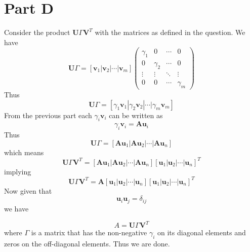 \documentclass[10pt]{report}
\begin{document}
\section*{Part D}
Consider the product $\textbf{U} \Gamma \textbf{V}^T$ with the matrices as defined in the question. We have
$$\textbf{U} \Gamma = [ \textbf{v}_1 | \textbf{v}_2 | \cdots | \textbf{v}_m ] \begin{pmatrix}
\gamma_{1} & 0 & \cdots & 0 \\
0 & \gamma_{2} & \cdots & 0 \\
\vdots  & \vdots  & \ddots & \vdots  \\
0 & 0 & \cdots & \gamma_{m}
\end{pmatrix}$$
Thus
$$\textbf{U} \Gamma = [ \gamma_1 \textbf{v}_1 | \gamma_2 \textbf{v}_2 | \cdots | \gamma_m \textbf{v}_m ] $$
From the previous part each $\gamma_{i} \textbf{v}_i$ can be written as
$$\gamma_{i} \textbf{v}_i = \textbf{Au}_i$$
Thus $$\textbf{U} \Gamma = [ \textbf{Au}_1 | \textbf{Au}_2 | \cdots | \textbf{Au}_n ] $$
which means
$$\textbf{U} \Gamma \textbf{V}^T = [ \textbf{Au}_1 | \textbf{Au}_2 | \cdots | \textbf{Au}_n ]  [ \textbf{u}_1 | \textbf{u}_2 | \cdots | \textbf{u}_n ]^T$$
implying
$$\textbf{U} \Gamma \textbf{V}^T = \textbf{A} [ \textbf{u}_1 | \textbf{u}_2 | \cdots | \textbf{u}_n ]  [ \textbf{u}_1 | \textbf{u}_2 | \cdots | \textbf{u}_n ]^T$$
Now given that $$\textbf{u}_i \textbf{u}_j = \delta_{ij}$$ we have

$$A = \textbf{U} \Gamma \textbf{V}^T$$
where $\Gamma$ is a matrix that has the non-negative $\gamma_i$ on its diagonal elements and zeros on the off-diagonal elements.
Thus we are done.
\end{document}
